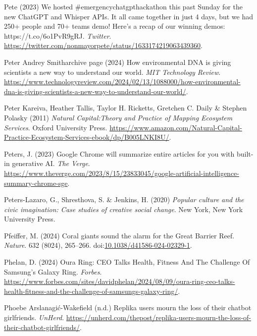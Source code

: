 \documentclass[
  letterpaper,
  DIV=11,
  numbers=noendperiod]{scrartcl}
\newlength{\cslhangindent}
\newenvironment{CSLReferences}[2] %
 {\begin{list}{}{%
  \setlength{\itemindent}{0pt}
  \setlength{\leftmargin}{0pt}
  \setlength{\parsep}{0pt}
  \ifodd #1
   \setlength{\leftmargin}{\cslhangindent}
   \setlength{\itemindent}{-1\cslhangindent}
  \fi
  \setlength{\itemsep}{#2\baselineskip}}}
 {\end{list}}
\begin{document}
\begin{CSLReferences}{0}{1}
Pete (2023) We hosted \#emergencychatgpthackathon this past {Sunday} for
the new {ChatGPT} and {Whisper APIs}. {It} all came together in just 4
days, but we had 250+ people and 70+ teams demo! {Here}'s a recap of our
winning demos: {https://t.co/6o1PvR9gRJ}. \emph{Twitter}.
\url{https://twitter.com/nonmayorpete/status/1633174219063439360}.

Peter Andrey Smitharchive page (2024) How environmental {DNA} is giving
scientists a new way to understand our world. \emph{MIT Technology
Review}.
\url{https://www.technologyreview.com/2024/02/13/1088000/how-environmental-dna-is-giving-scientists-a-new-way-to-understand-our-world/}.

Peter Kareiva, Heather Tallis, Taylor H. Ricketts, Gretchen C. Daily \&
Stephen Polasky (2011) \emph{Natural {Capital}:{Theory} and {Practice}
of {Mapping Ecosystem Services}}. Oxford University Press.
\url{https://www.amazon.com/Natural-Capital-Practice-Ecosystem-Services-ebook/dp/B005LNKI8U/}.

Peters, J. (2023) Google {Chrome} will summarize entire articles for you
with built-in generative {AI}. \emph{The Verge}.
\url{https://www.theverge.com/2023/8/15/23833045/google-artificial-intelligence-summary-chrome-sge}.

Peters-Lazaro, G., Shresthova, S. \& Jenkins, H. (2020) \emph{Popular
culture and the civic imagination: Case studies of creative social
change}. New York, New York University Press.

Pfeiffer, M. (2024) Coral giants sound the alarm for the {Great Barrier
Reef}. \emph{Nature}. 632 (8024), 265--266.
doi:\href{https://doi.org/10.1038/d41586-024-02329-1}{10.1038/d41586-024-02329-1}.

Phelan, D. (2024) Oura {Ring}: {CEO Talks Health}, {Fitness And The
Challenge Of Samsung}'s {Galaxy Ring}. \emph{Forbes}.
\url{https://www.forbes.com/sites/davidphelan/2024/08/09/oura-ring-ceo-talks-health-fitness-and-the-challenge-of-samsungs-galaxy-ring/}.

Phoebe Arslanagić-Wakefield (n.d.) Replika users mourn the loss of their
chatbot girlfriends. \emph{UnHerd}.
\url{https://unherd.com/thepost/replika-users-mourn-the-loss-of-their-chatbot-girlfriends/}.


\end{CSLReferences}
\end{document}
